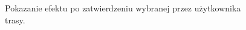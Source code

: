 \noindent
\setlength{\fboxrule}{0.5pt}
\begin{figure}[H]
    \centering
    \caption{Pokazanie efektu po zatwierdzeniu wybranej przez użytkownika trasy.}
    \label{widok:zatwierdztrase}
\end{figure}
\\

